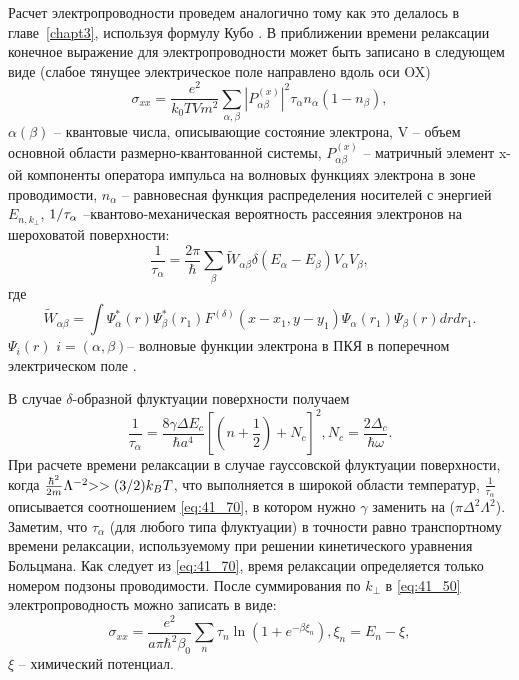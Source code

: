 Расчет электропроводности проведем аналогично тому как это делалось в главе~\ref{chapt3}, используя формулу Кубо \cite{Kubo1957a}. В приближении времени релаксации \cite{Khamidullin2002} конечное выражение для электропроводности может быть записано в следующем виде (слабое тянущее электрическое поле направлено вдоль оси OX)
\begin{equation} \label{eq:41_50}
\sigma _{xx} =\frac{e^{2} }{k_{0} TVm^{2} } \sum _{\alpha ,\beta }\left|P_{\alpha \beta }^{\left(x\right)} \right|^{2} \tau _{\alpha } n_{\alpha } \left(1-n_{\beta } \right) ,
\end{equation} 
$\alpha (\beta )$ -- квантовые числа, описывающие состояние электрона, V -- объем основной области размерно-квантованной системы, $P_{\alpha \beta }^{\left(x\right)} $ -- матричный элемент x-ой компоненты оператора импульса на волновых функциях электрона в зоне проводимости, $n_{\alpha } $ -- равновесная функция распределения носителей с энергией $E_{n,k_{\bot } } $, ${1 \mathord{\left/{\vphantom{1 \tau _{\alpha } }}\right.\kern-\nulldelimiterspace} \tau _{\alpha } } $ --квантово-механическая вероятность рассеяния электронов на шероховатой поверхности:
\begin{equation} \label{eq:41_60}
\frac{1}{\tau _{\alpha } } =\frac{2\pi }{\hbar } \sum _{\beta }\tilde{W}_{\alpha \beta } \delta \left(E_{\alpha } -E_{\beta } \right) V_{\alpha } V_{\beta } ,
\end{equation}
где  
\[
\tilde{W}_{\alpha \beta } =\int \Psi _{\alpha }^{*} \left(r\right)\Psi _{\beta }^{*} \left(r_{1} \right)F^{(\delta )} \left(x-x_{1} ,y-y_{1} \right)\Psi _{\alpha } \left(r_{1} \right)\Psi _{\beta } \left(r\right)drdr_{1}  .
\] 
$\Psi _{i} \left(r\right)$ $i=(\alpha ,\beta )$-- волновые функции электрона в ПКЯ в поперечном электрическом поле \cite{Sinyavskii1998}.

В случае $\delta $-образной флуктуации поверхности получаем
\begin{equation} \label{eq:41_70}
\frac{1}{\tau _{\alpha } } =\frac{8\gamma \Delta E_{c} }{\hbar a^{4} } \left[\left(n+\frac{1}{2} \right)+N_{c} \right]^{2} , N_{c} =\frac{2\Delta _{c} }{\hbar \omega } .
\end{equation}  
При расчете времени релаксации в случае гауссовской флуктуации поверхности, когда $\frac{\hbar ^{2} }{2m} \Lambda ^{-2} {>>(3 \mathord{\left/{\vphantom{>>(3 2}}\right.\kern-\nulldelimiterspace} 2} )k_{B} T$, что выполняется в широкой области температур, $\frac{1}{\tau _{\alpha } } $ описывается соотношением \eqref{eq:41_70}, в котором нужно $\gamma $ заменить на ($\pi \Delta ^{2} \Lambda ^{2} $). Заметим, что $\tau _{\alpha } $ (для любого типа флуктуации) в точности равно транспортному времени релаксации, используемому при решении кинетического уравнения Больцмана. Как следует из \eqref{eq:41_70}, время релаксации определяется только номером подзоны проводимости. После суммирования по $k_{\bot } $ в \eqref{eq:41_50} электропроводность можно записать в виде:
\begin{equation} \label{eq:41_80}
\sigma _{xx} =\frac{e^{2} }{a\pi \hbar ^{2} \beta _{0} } \sum _{n}\tau _{n} \ln \left(1+e^{-\beta \xi _{n} } \right) , \xi _{n} =E_{n} -\xi ,
\end{equation}
$\xi $ -- химический потенциал.

